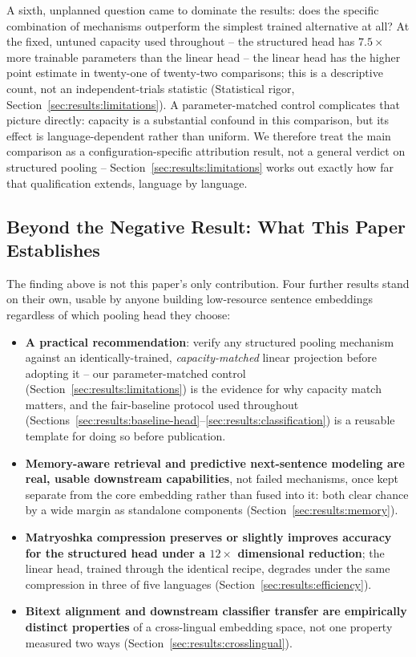 \documentclass[manuscript]{acmart}
\begin{document}
A sixth, unplanned question came to dominate the results: does the specific combination of mechanisms outperform the simplest trained alternative at all? At the fixed, untuned capacity used throughout -- the structured head has $7.5\times$ more trainable parameters than the linear head -- the linear head has the higher point estimate in twenty-one of twenty-two comparisons; this is a descriptive count, not an independent-trials statistic (Statistical rigor, Section~\ref{sec:results:limitations}). A parameter-matched control complicates that picture directly: capacity is a substantial confound in this comparison, but its effect is language-dependent rather than uniform. We therefore treat the main comparison as a configuration-specific attribution result, not a general verdict on structured pooling -- Section~\ref{sec:results:limitations} works out exactly how far that qualification extends, language by language.

\subsection{Beyond the Negative Result: What This Paper Establishes}
\label{sec:contributions}

The finding above is not this paper's only contribution. Four further results stand on their own, usable by anyone building low-resource sentence embeddings regardless of which pooling head they choose:

\begin{itemize}
\item \textbf{A practical recommendation}: verify any structured pooling mechanism against an identically-trained, \emph{capacity-matched} linear projection before adopting it -- our parameter-matched control (Section~\ref{sec:results:limitations}) is the evidence for why capacity match matters, and the fair-baseline protocol used throughout (Sections~\ref{sec:results:baseline-head}--\ref{sec:results:classification}) is a reusable template for doing so before publication.
\item \textbf{Memory-aware retrieval and predictive next-sentence modeling are real, usable downstream capabilities}, not failed mechanisms, once kept separate from the core embedding rather than fused into it: both clear chance by a wide margin as standalone components (Section~\ref{sec:results:memory}).
\item \textbf{Matryoshka compression preserves or slightly improves accuracy for the structured head under a $12\times$ dimensional reduction}; the linear head, trained through the identical recipe, degrades under the same compression in three of five languages (Section~\ref{sec:results:efficiency}).
\item \textbf{Bitext alignment and downstream classifier transfer are empirically distinct properties} of a cross-lingual embedding space, not one property measured two ways (Section~\ref{sec:results:crosslingual}).
\end{itemize}
\end{document}
